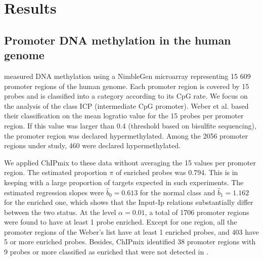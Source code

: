 \documentclass{llncs}
\begin{document}


\section{Results}\label{appli}

\subsection{Promoter DNA methylation in the human genome}
\cite{Schubeler07} measured DNA methylation using a NimbleGen
microarray representing 15 609 promoter regions of the human genome.
Each promoter region is covered by 15 probes and is classified into
a category according to its CpG rate. We focus on the analysis of
the class ICP (intermediate CpG promoter). Weber et al. based their
classification on the mean logratio value for the 15 probes per
promoter region. If this value was larger than 0.4 (threshold based
on bisulfite sequencing), the promoter region was declared
hypermethylated. Among the 2056 promoter regions under study, 460
were declared hypermethylated. {\par} We applied ChIPmix to these
data without averaging the 15 values per promoter region. The
estimated proportion $\pi$ of enriched probes was 0.794. This is in
keeping with a large proportion of targets expected in such
experiments. The estimated regression slopes were
$\widehat{b}_0=0.613$ for the normal class and $\widehat{b}_1=1.162$
for the enriched one, which shows that the Input-Ip relations
substantially differ between the two status. At the level
$\alpha=0.01$, a total of 1706 promoter regions were found to have
at least 1 probe enriched. Except for one region, all the promoter
regions of the Weber's list have at least 1 enriched probes, and 403
have 5 or more enriched probes. Besides, ChIPmix identified 38
promoter regions with 9 probes or more classified as enriched that
were not detected in \cite{Schubeler07}.
\end{document}
